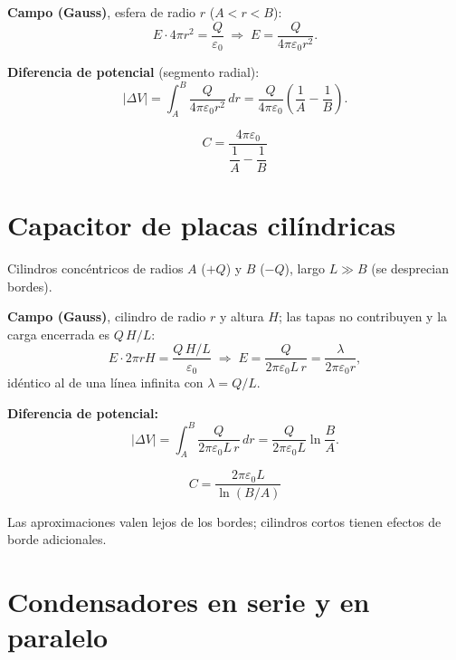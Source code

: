 \documentclass[12pt,a4paper]{article}
\begin{document}
\textbf{Campo (Gauss)}, esfera de radio $r$ ($A<r<B$):
\[
E\cdot 4\pi r^2 = \frac{Q}{\varepsilon_0}
\;\Longrightarrow\;
E = \frac{Q}{4\pi\varepsilon_0 r^2}.
\]

\textbf{Diferencia de potencial} (segmento radial):
\[
|\Delta V| = \int_A^B \frac{Q}{4\pi\varepsilon_0 r^2}\,dr
           = \frac{Q}{4\pi\varepsilon_0}\left(\frac{1}{A}-\frac{1}{B}\right).
\]

\begin{keybox}
  \[
  \boxed{C = \frac{4\pi\varepsilon_0}{\dfrac{1}{A}-\dfrac{1}{B}}}
  \]
\end{keybox}



\section{Capacitor de placas cilíndricas}

Cilindros concéntricos de radios $A$ ($+Q$) y $B$ ($-Q$), largo
$L \gg B$ (se desprecian bordes).

\textbf{Campo (Gauss)}, cilindro de radio $r$ y altura $H$; las tapas no
contribuyen y la carga encerrada es $Q\,H/L$:
\[
E\cdot 2\pi r H = \frac{Q\,H/L}{\varepsilon_0}
\;\Longrightarrow\;
E = \frac{Q}{2\pi\varepsilon_0 L\, r} = \frac{\lambda}{2\pi\varepsilon_0 r},
\]
idéntico al de una línea infinita con $\lambda = Q/L$.

\textbf{Diferencia de potencial:}
\[
|\Delta V| = \int_A^B \frac{Q}{2\pi\varepsilon_0 L\, r}\,dr
           = \frac{Q}{2\pi\varepsilon_0 L}\ln\!\frac{B}{A}.
\]

\begin{keybox}
  \[
  \boxed{C = \frac{2\pi\varepsilon_0 L}{\ln(B/A)}}
  \]
\end{keybox}

\begin{notebox}[Bordes]
  Las aproximaciones valen lejos de los bordes; cilindros cortos tienen
  efectos de borde adicionales.
\end{notebox}



\section{Condensadores en serie y en paralelo}
\end{document}
